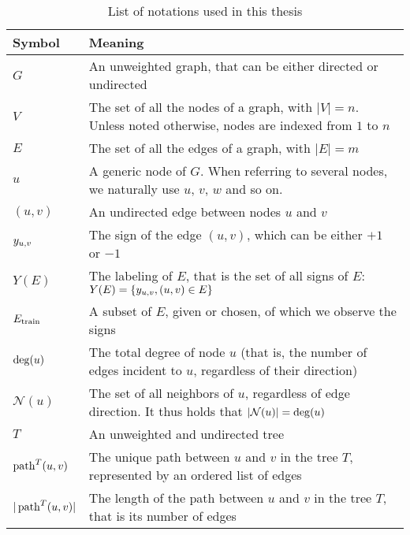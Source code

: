 \begin{table*}[thpb]
  \centering
  \caption{List of notations used in this thesis}\label{tab:notations}%
  \vspace{-.5\baselineskip}
  \begin{tabulary}{187mm}{LL}
    \toprule
    Symbol & Meaning \\
    \midrule
    $G$ & An unweighted graph, that can be either directed or undirected \\
    $V$ & The set of all the nodes of a graph, with $|V|=n$. Unless noted otherwise, nodes are indexed from $1$ to $n$ \\
    $E$ & The set of all the edges of a graph, with $|E|=m$ \\
    $u$ & A generic node of $G$. When referring to several nodes, we naturally use $u$, $v$, $w$ and so on. \\
    $(u,v)$ & An undirected edge between nodes $u$ and $v$ \\
    $y_{u, v}{}$ & The sign of the edge $(u,v)$, which can be either $+1$ or $-1$ \\
    $Y(E)$ & The labeling of $E$, that is the set of all signs of $E$: $Y(E) = \{y_{u, v} , (u,v)\in E\}$ \\
    $E_{\mathrm{train}}$ & A subset of $E$, given or chosen, of which we observe the signs \\
    $\operatorname{deg}(u)$ & The total degree of node $u$ (that is, the number of edges incident to $u$,
    regardless of their direction) \\
    $\mathcal{N}(u)$ & The set of all neighbors of $u$, regardless of edge direction. It thus holds
    that $|\mathcal{N}(u)| = \operatorname{deg}(u)$ \\
    $T$ & An unweighted and undirected tree \\
    $\operatorname{path}^T(u, v)$ & The unique path between $u$ and $v$ in the tree $T$, represented by an ordered list of edges \\
    $|\operatorname{path}^T(u, v)|$ & The length of the path between $u$ and $v$ in the tree $T$, that is its number of edges \\
    \bottomrule
  \end{tabulary}
\end{table*}
